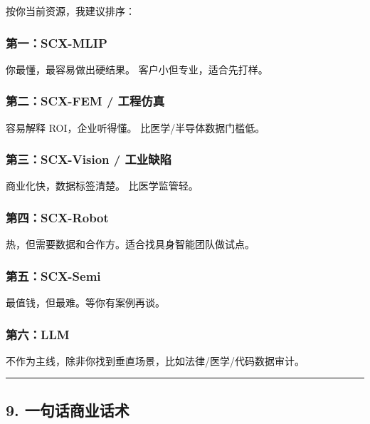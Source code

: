 \documentclass[
  12pt,
]{ctexart}
\begin{document}
按你当前资源，我建议排序：

\subsubsection{第一：SCX-MLIP}\label{ux7b2cux4e00scx-mlip}

你最懂，最容易做出硬结果。 客户小但专业，适合先打样。

\subsubsection{第二：SCX-FEM /
工程仿真}\label{ux7b2cux4e8cscx-fem-ux5de5ux7a0bux4effux771f}

容易解释 ROI，企业听得懂。 比医学/半导体数据门槛低。

\subsubsection{第三：SCX-Vision /
工业缺陷}\label{ux7b2cux4e09scx-vision-ux5de5ux4e1aux7f3aux9677}

商业化快，数据标签清楚。 比医学监管轻。

\subsubsection{第四：SCX-Robot}\label{ux7b2cux56dbscx-robot}

热，但需要数据和合作方。适合找具身智能团队做试点。

\subsubsection{第五：SCX-Semi}\label{ux7b2cux4e94scx-semi}

最值钱，但最难。等你有案例再谈。

\subsubsection{第六：LLM}\label{ux7b2cux516dllm}

不作为主线，除非你找到垂直场景，比如法律/医学/代码数据审计。

\begin{center}\rule{0.5\linewidth}{0.5pt}\end{center}

\subsection{9.
一句话商业话术}\label{ux4e00ux53e5ux8bddux5546ux4e1aux8bddux672f}
\end{document}
